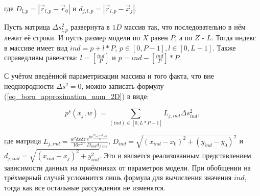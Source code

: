 \documentclass{article}
\begin{document}
где $D_{l,p}=|\vec{r}_{l,p}-\vec{r}_0|$ и $d_{j,l,p}=|\vec{r}_{l,p}-\vec{x}_j|$.

Пусть матрица $\Delta s_{l,p}^2$ развернута в $1D$ массив так, что последовательно в нём лежат её строки.
И пусть размер модели по $X$ равен $P$, а по $Z$ - $L$.
Тогда индекс в массиве имеет вид $ind = p + l * P$, $p \in [0, P - 1], l \in [0, L - 1]$.
Также справедливы равенства: $l = [\frac{ind}{P}]$ и $p = ind - [\frac{ind}{P}] * P$.

С учётом введённой параметризации массива и того факта, что вне неоднородности $\Delta s^2 = 0$, можно записать формулу (\ref{eq_born_approximation_num_2D}) в виде:

\begin{equation}
\label{eq_born_approximation_num_2D_ind}
p^s(x_j, w) = \sum_{(ind)\in [0, L * P - 1]} L_{j,ind} \Delta s_{ind}^2,
\end{equation}

где матрица $L_{j,ind} = \frac{w^2 \delta x \delta z}{16\pi^2} \frac{e^{iw\frac{D_{ind}+d_{j,ind}}{c_b}}}{D_{ind}d_{j,ind}}$,
$D_{ind}=\sqrt{(x_{ind} - x_0)^2 + (y_{ind} - y_0)^2}$ и $d_{j,ind}=\sqrt{(x_{ind} - x_j)^2 + y_{ind}^2}$.
Это и является реализованным представлением зависимости данных на приёмниках от параметров модели.
При обобщении на трёхмерный случай усложнится лишь формула для вычисления значения $ind$, тогда как все остальные рассуждения не изменятся.



\end{document}
